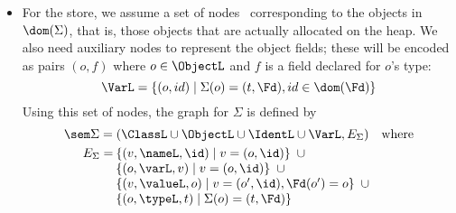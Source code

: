 \begin{itemize}
\item For the store, we assume a set of nodes \ObjectL~corresponding to the
  objects in $\dom(\Sigma)$, that is, those objects that are actually allocated
  on the heap. We also need auxiliary nodes to represent the object fields;
  these will be encoded as pairs $(o,f)$ where $o\in \ObjectL$ and $f$ is a
  field declared for $o$'s type:
  \[ \VarL = \{ (o,id) \mid \Sigma(o) = (t,\Fd), id \in \dom(\Fd) \}
  \]
Using this set of nodes, the graph for $\Sigma$ is defined by
%
\[\begin{array}{l}
\sem \Sigma = (\ClassL \cup \ObjectL \cup \IdentL \cup \VarL, E_{\Sigma})
\quad \mbox{where}
\\[\smallskipamount]
\quad \begin{array}[t]{l@{{\:}}l}
E_{\Sigma}  = &\{ (v, \nameL, \id) \mid v = (o,\id)  \} \enspace \cup\\
& \{ (o, \varL, v) \mid v = (o,\id) \} \enspace  \cup\\
& \{ (v, \valueL,o) \mid v=(o',\id), \Fd(o') = o \} \enspace \cup\\
& \{ (o, \typeL,t) \mid \Sigma(o) = (t,\Fd) \}
\end{array}
\end{array}\]
\end{itemize}

